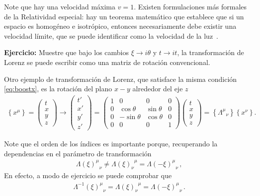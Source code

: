 Note que hay una velocidad máxima $v=1$.  Existen formulaciones más formales de la Relatividad especial: hay un teorema matemático que establece que si un espacio es homogéneo e isotrópico, entonces necesariamente debe existir una velocidad límite, que se puede identificar como la velocidad de la luz~\cite{drory2016function}. 

\textbf{Ejercicio:} Muestre que bajo los cambios $\xi\to i\theta$ y $t\to it$, la transformación de Lorenz se puede escribir como una matriz de rotación convencional.

Otro ejemplo de transformación de Lorenz, que satisface la misma condición \eqref{eq:boostx}, es la rotación del plano $x-y$ alrededor del eje $z$
\begin{align}
    \left\{x^\mu\right\}=\begin{pmatrix}
    t\\
    x\\
    y\\
    z
  \end{pmatrix}\to
  \begin{pmatrix}
    t'\\
    x'\\
    y'\\
    z'
  \end{pmatrix}= 
  \begin{pmatrix}
    1     &0&0&0\\
    0     &\cos\theta&\sin\theta&0\\
    0     & -\sin\theta  &\cos\theta&0\\
    0     &  0  &0&1
  \end{pmatrix}
  \begin{pmatrix}
    t\\
    x\\
    y\\
    z
  \end{pmatrix}
=\left\{{\Lambda^\mu}_{\nu}\right\}\left\{x^\nu\right\}.
\end{align}

Note que el orden de los índices es importante porque, recuperando la dependencias en el parámetro de transformación
\begin{align}
  {\Lambda(\xi)^{\mu}}_{\nu}\ne {\Lambda(\xi)_{\nu}}^{\mu}={\Lambda(-\xi)^{\mu}}_{\nu}\,,
\end{align}
En efecto, a modo de ejercicio se puede comprobar que
\begin{align}
{\Lambda^{-1}(\xi)^{\mu}}_{\nu} ={\Lambda(\xi)_{\nu}}^{\mu}= {\Lambda(-\xi)^{\mu}}_{\nu}\,.
\end{align}


